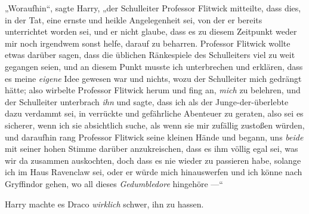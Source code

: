 „Woraufhin“, sagte Harry, „der Schulleiter Professor Flitwick mitteilte, dass dies, in der Tat, eine ernste und heikle Angelegenheit sei, von der er bereits unterrichtet worden sei, und er nicht glaube, dass es zu diesem Zeitpunkt weder mir noch irgendwem sonst helfe, darauf zu beharren. Professor Flitwick wollte etwas darüber sagen, dass die üblichen Ränkespiele des Schulleiters viel zu weit gegangen seien, und an diesem Punkt musste ich unterbrechen und erklären, dass es meine \emph{eigene} Idee gewesen war und nichts, wozu der Schulleiter mich gedrängt hätte; also wirbelte Professor Flitwick herum und fing an, \emph{mich} zu belehren, und der Schulleiter unterbrach \emph{ihn} und sagte, dass ich als der Junge-der-überlebte dazu verdammt sei, in verrückte und gefährliche Abenteuer zu geraten, also sei es sicherer, wenn ich sie absichtlich suche, als wenn sie mir zufällig zustoßen würden, und daraufhin rang Professor Flitwick seine kleinen Hände und begann, uns \emph{beide} mit seiner hohen Stimme darüber anzukreischen, dass es ihm völlig egal sei, was wir da zusammen auskochten, doch dass es nie wieder zu passieren habe, solange ich im Haus Ravenclaw sei, oder er würde mich hinauswerfen und ich könne nach Gryffindor gehen, wo all dieses \emph{Gedumbledore} hingehöre —“

Harry machte es Draco \emph{wirklich} schwer, ihn zu hassen.

